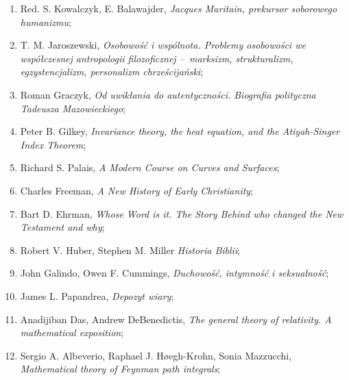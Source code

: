 \documentclass[a4paper,11pt]{article}
\begin{document}
\begin{enumerate}
\item Red. S. Kowalczyk, E. Balawajder, \textit{Jacques Maritain,
    prekursor soborowego humanizmu};



\item T. M. Jaroszewski, \textit{Osobowość i wspólnota. Problemy
    osobowości we współczesnej antropologii filozoficznej --~marksizm,
    strukturalizm, egzystencjalizm, personalizm chrześcijański};



\item Roman Graczyk, \textit{Od uwikłania do autentyczności. Biografia
    polityczna Tadeusza Mazowieckiego};



\item Peter B. Gilkey, \textit{Invariance theory, the heat equation, and
    the Atiyah-Singer Index Theorem};



\item Richard S. Palais, \textit{A Modern Course on Curves and
    Surfaces};



\item Charles Freeman, \textit{A New History of Early Christianity};



\item Bart D. Ehrman, \textit{Whose Word is it. The Story Behind who
    changed the New Testament and why};



\item Robert V. Huber, Stephen M. Miller \textit{Historia Biblii};



\item John Galindo, Owen F. Cummings, \textit{Duchowość, intymność i
    seksualność};



\item James L. Papandrea, \textit{Depozyt wiary};



\item Anadijiban Das, Andrew DeBenedictis, \textit{The general theory of
    relativity. A mathematical exposition};



\item Sergio A. Albeverio, Raphael J. H\o egh-Krohn, Sonia Mazzucchi,
  \textit{Mathematical theory of Feynman path integrals};




\end{enumerate}
\end{document}
